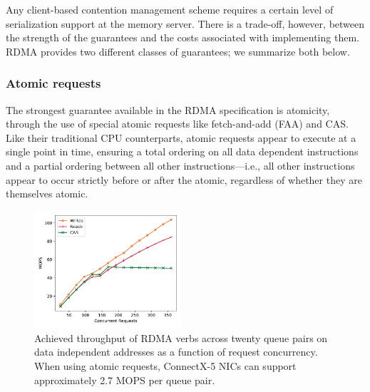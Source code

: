 Any client-based contention management scheme requires a certain level
of serialization support at the memory server.  There is a trade-off,
however, between the strength of the guarantees and the costs
associated with implementing them.  RDMA provides two different
classes of guarantees; we summarize both below.

\subsubsection{Atomic requests}

The strongest guarantee available in the RDMA specification is atomicity,
through the use of special atomic requests like fetch-and-add (FAA) and CAS.
Like their traditional CPU counterparts, atomic requests appear to execute at a
single point in time, ensuring a total ordering on all data dependent
instructions and a partial ordering between all other instructions---i.e., all
other instructions appear to occur strictly before or after the atomic,
regardless of whether they are themselves atomic.

\begin{figure}[t]
  \includegraphics[width=0.485\textwidth]{fig/rdma_concur.pdf}

    \caption{Achieved throughput of RDMA verbs across twenty queue pairs on data
    independent addresses as a function of request concurrency.  When using
    atomic requests, ConnectX-5 NICs can support approximately 2.7 MOPS per
    queue pair.}

    \label{fig:rdma_concur}
\end{figure}

